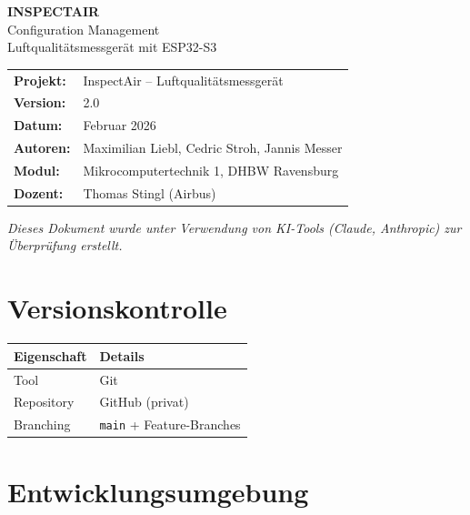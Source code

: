 \documentclass[a4paper,11pt]{article}
\begin{document}
\begin{center}
{\LARGE\textbf{INSPECTAIR}}\\[0.3cm]
{\Large Configuration Management}\\[0.3cm]
{\large Luftqualitätsmessgerät mit ESP32-S3}\\[0.5cm]
\begin{tabular}{ll}
\textbf{Projekt:} & InspectAir -- Luftqualitätsmessgerät \\
\textbf{Version:} & 2.0 \\
\textbf{Datum:} & Februar 2026 \\
\textbf{Autoren:} & Maximilian Liebl, Cedric Stroh, Jannis Messer \\
\textbf{Modul:} & Mikrocomputertechnik 1, DHBW Ravensburg \\
\textbf{Dozent:} & Thomas Stingl (Airbus) \\
\end{tabular}
\end{center}

\vspace{0.5cm}
\noindent\textit{Dieses Dokument wurde unter Verwendung von KI-Tools (Claude, Anthropic) zur Überprüfung erstellt.}
\vspace{0.3cm}

\tableofcontents
\newpage

\section{Versionskontrolle}

\begin{longtable}{p{4cm} p{9cm}}
\toprule
\rowcolor{tableheader}
\textbf{Eigenschaft} & \textbf{Details} \\
\midrule
\endhead
Tool       & Git \\
Repository & GitHub (privat) \\
Branching  & \texttt{main} + Feature-Branches \\
\bottomrule
\end{longtable}

\section{Entwicklungsumgebung}
\end{document}

